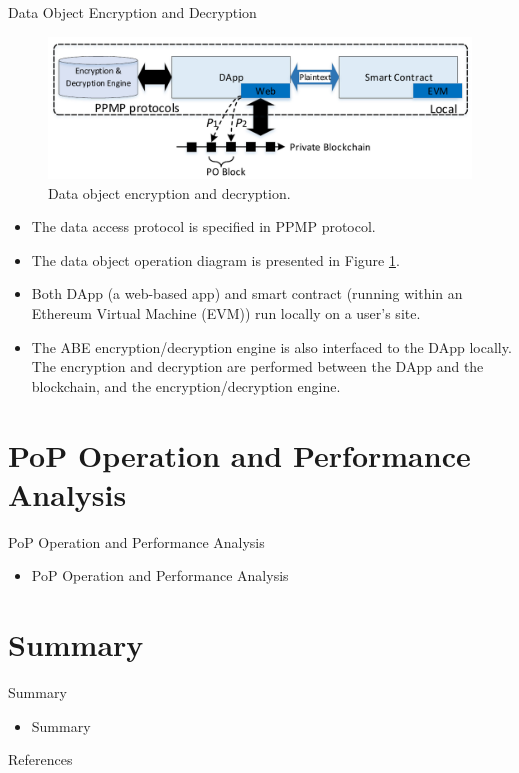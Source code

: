 \documentclass[11pt]{beamer}
\begin{document}
\begin{frame}[allowframebreaks]{Data Object Encryption and Decryption}

\begin{figure}
\includegraphics[scale=0.3]{dataobjectencdec.png}
\caption{Data object encryption and decryption.}
\label{fig:datobjencdec}
\end{figure}

\begin{itemize}

\item The data access protocol is specified in PPMP protocol.
\item The data object operation diagram is presented in Figure \ref{fig:datobjencdec}.
\item Both DApp (a web-based app) and smart contract (running within an Ethereum Virtual Machine (EVM)) run locally on a user's site.
\item The ABE encryption/decryption engine is also interfaced to the DApp locally. The encryption and decryption are performed between the DApp and the blockchain, and the encryption/decryption engine.

\end{itemize}

\end{frame}

\section{PoP Operation and Performance Analysis}
\begin{frame}{PoP Operation and Performance Analysis}
\begin{itemize}
	\item PoP Operation and Performance Analysis
\end{itemize}
\end{frame}

\section{Summary}
\begin{frame}{Summary}
\begin{itemize}
	\item Summary
\end{itemize}
\end{frame}

\begin{frame}[allowframebreaks]{References}
\printbibliography
\end{frame}
\end{document}

